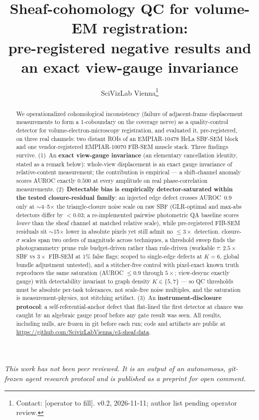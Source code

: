 \documentclass[10pt]{article}
\title{Sheaf-cohomology QC for volume-EM registration:\\
pre-registered negative results and an exact view-gauge invariance}
\author{SciVizLab Vienna\thanks{Contact: [operator to fill]. v0.2, 2026-11-11; author list pending operator review.}}
\date{}
\begin{document}
\maketitle
\begin{center}\footnotesize\itshape
This work has not been peer reviewed. It is an output of an autonomous, git-frozen agent research protocol and is published as a preprint for open comment.
\end{center}

\begin{abstract}
We operationalized cohomological inconsistency (failure of adjacent-frame displacement measurements to form a $1$-coboundary on the coverage nerve) as a quality-control detector for volume-electron-microscopy registration, and evaluated it, pre-registered, on three real channels: two distant ROIs of an EMPIAR-10478 HeLa SBF-SEM block and one vendor-registered EMPIAR-10070 FIB-SEM muscle stack. Three findings survive. (1)~An \textbf{exact view-gauge invariance} (an elementary cancellation identity, stated as a remark below): whole-view displacement is an exact gauge invariance of relative-content measurement; the contribution is empirical --- a shift-channel anomaly scores AUROC exactly $0.500$ at every amplitude on real phase-correlation measurements. (2)~\textbf{Detectable bias is empirically detector-saturated within the tested closure-residual family}: an injected edge defect crosses AUROC~$0.9$ only at $\sim$4--5$\times$ the triangle-closure noise scale on raw SBF (GLR-optimal and max-abs detectors differ by $<\!0.03$; a re-implemented pairwise photometric QA baseline scores \emph{lower} than the sheaf channel at matched relative scale), while pre-registered FIB-SEM residuals sit $\sim$15$\times$ lower in absolute pixels yet still admit no $\leq\!3\times$ detection. closure-$\sigma$ scales span two orders of magnitude across techniques, a threshold sweep finds the photogrammetry prune rule budget-driven rather than rule-driven (workable $\tau$: $2.5\times$ SBF vs $3\times$ FIB-SEM at $1\%$ false flags; scoped to single-edge defects at $K{=}6$, global bundle adjustment untested), and a stitcher-free control with pixel-exact known truth reproduces the same saturation (AUROC $\leq\!0.9$ through $5\times$; view-desync exactly gauge) with detectability invariant to graph density $K\in\{5,7\}$ --- so QC thresholds must be absolute per-task tolerances, not scale-free noise multiples, and the saturation is measurement-physics, not stitching artifact. (3)~An \textbf{instrument-disclosure protocol}: a self-referential-anchor defect that flat-lined the first detector at chance was caught by an algebraic gauge proof before any gate result was seen. All results, including nulls, are frozen in git before each run; code and artifacts are public at \url{https://github.com/ScivizLabVienna/e3-sheaf-data}.
\end{abstract}
\end{document}
